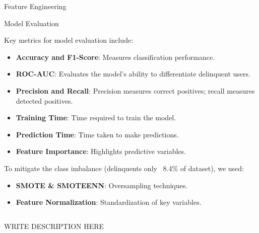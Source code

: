 \documentclass[final]{beamer}
\newlength{\colwidth}
\begin{document}
\begin{frame}[t]
\begin{columns}[t]
\begin{column}{\colwidth}
\begin{block}{Feature Engineering}
  \end{block}

  \begin{block}{Model Evaluation}

    Key metrics for model evaluation include:
    \begin{itemize}
        \item \textbf{Accuracy and F1-Score}: Measures classification performance.
        \item \textbf{ROC-AUC}: Evaluates the model's ability to differentiate delinquent users.
        \item \textbf{Precision and Recall}: Precision measures correct positives; recall measures detected positives.
        \item \textbf{Training Time}: Time required to train the model.
        \item \textbf{Prediction Time}: Time taken to make predictions.
        \item \textbf{Feature Importance}: Highlights predictive variables.
    \end{itemize}
    To mitigate the class imbalance (delinquents only ~8.4\% of dataset), we used:
    \begin{itemize}
        \item \textbf{SMOTE \& SMOTEENN}: Oversampling techniques.
        \item \textbf{Feature Normalization}: Standardization of key variables.
    \end{itemize}

\vspace{1em}

\begin{columns}
\begin{column}{0.5\textwidth}  %
\justify
WRITE DESCRIPTION HERE


\end{column}
\end{columns}
\end{block}
\end{column}
\end{columns}
\end{frame}
\end{document}

